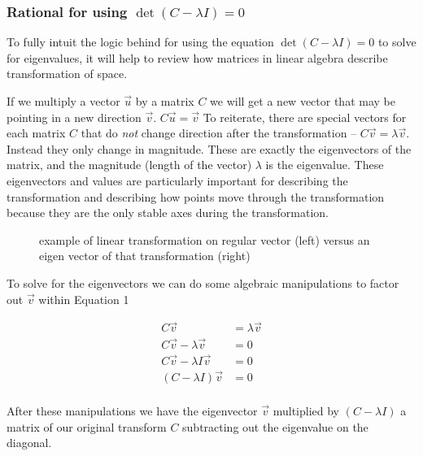 \documentclass[
  letterpaper,
  DIV=11,
  numbers=noendperiod]{scrartcl}
\begin{document}
\hypertarget{rational-for-using-detc-lambda-i-0}{%
\subsubsection{\texorpdfstring{Rational for using
\(\det(C-\lambda I) = 0\)}{Rational for using \textbackslash det(C-\textbackslash lambda I) = 0}}\label{rational-for-using-detc-lambda-i-0}}

To fully intuit the logic behind for using the equation
\(\det(C-\lambda I) = 0\) to solve for eigenvalues, it will help to
review how matrices in linear algebra describe transformation of space.

If we multiply a vector \(\vec{u}\) by a matrix \(C\) we will get a new
vector that may be pointing in a new direction \(\vec{v}\).
\(C\vec{u} = \vec{v}\) To reiterate, there are special vectors for each
matrix \(C\) that do \emph{not} change direction after the
transformation -- \(C\vec{v} = \lambda\vec{v}\). Instead they only
change in magnitude. These are exactly the eigenvectors of the matrix,
and the magnitude (length of the vector) \(\lambda\) is the eigenvalue.
These eigenvectors and values are particularly important for describing
the transformation and describing how points move through the
transformation because they are the only stable axes during the
transformation.

\begin{figure}

{\centering 

}

\caption{\label{fig-vectors}example of linear transformation on regular
vector (left) versus an eigen vector of that transformation (right)}

\end{figure}

To solve for the eigenvectors we can do some algebraic manipulations to
factor out \(\vec{v}\) within Equation 1

\begin{align*}
    C\vec{v} &=  \lambda\vec{v} \\
    C\vec{v} - \lambda\vec{v} &= 0 \\
    C\vec{v} - \lambda I \vec{v} &= 0 \\
    (C - \lambda I )\vec{v} &= 0 \\
\end{align*}

After these manipulations we have the eigenvector \(\vec{v}\) multiplied
by \((C - \lambda I)\) a matrix of our original transform \(C\)
subtracting out the eigenvalue on the diagonal.
\end{document}

